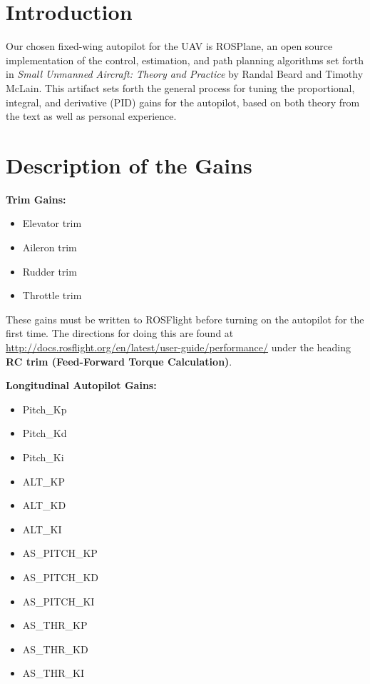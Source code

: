 \documentclass[]{auvsi_doc}
\begin{document}
\begin{AUVSITitlePage}
\begin{artifacttable}
\end{artifacttable}
\end{AUVSITitlePage}

\section{Introduction}

Our chosen fixed-wing autopilot for the UAV is ROSPlane, an open source implementation of the control, estimation, and path planning algorithms set forth in \textit{Small Unmanned Aircraft: Theory and Practice} by Randal Beard and Timothy McLain. This artifact sets forth the general process for tuning the proportional, integral, and derivative (PID) gains for the autopilot, based on both theory from the text as well as personal experience.

\section{Description of the Gains}

\textbf{Trim Gains:}
\begin{itemize}
  \item Elevator trim
  \item Aileron trim
  \item Rudder trim
  \item Throttle trim
\end{itemize}

These gains must be written to ROSFlight before turning on the autopilot for the first time. The directions for doing this are found at \url{http://docs.rosflight.org/en/latest/user-guide/performance/} under the heading \textbf{RC trim (Feed-Forward Torque Calculation)}.

\textbf{Longitudinal Autopilot Gains:}
\begin{itemize}
	\item Pitch\_Kp
	\item Pitch\_Kd
	\item Pitch\_Ki
	\item ALT\_KP
	\item ALT\_KD
	\item ALT\_KI
	\item AS\_PITCH\_KP
	\item AS\_PITCH\_KD
	\item AS\_PITCH\_KI
	\item AS\_THR\_KP
	\item AS\_THR\_KD
	\item AS\_THR\_KI
\end{itemize}
\end{document}

